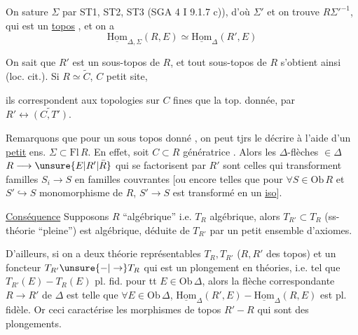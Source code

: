 On sature $\Sigma$ par ST1, ST2, ST3 (SGA 4 I 9.1.7 c)), d'où $\Sigma'$ et on trouve $R\Sigma'^{-1}$, qui est un \uline{topos} , et on a
\[
\underline{\mathrm{Hom}}_{\Delta,\Sigma}(R,E)\simeq\underline{\mathrm{Hom}}_\Delta(R',E)
\]




On sait que $R'$ est un sous-topos de $R$, et tout sous-topos de $R$ s'obtient ainsi (loc. cit.). Si $R\simeq\widetilde C$, $C$ petit site,


ils correspondent aux topologies  sur $C$  fines que la top. donnée, par $R'\longleftrightarrow\widetilde{(C,T')}$.

Remarquons que pour un sous topos donné , on peut tjrs le décrire à l'aide d'un \uline{petit} ens. $\Sigma\subset\mathrm{Fl}\,R$. En effet, soit $C\subset R$  génératrice . Alors les $\Delta$-flèches $\in\Delta$ $R\longrightarrow\unsure{E|R'|\bar R}$ qui se factorisent par $R'$ sont celles qui transforment familles  $S_i\to S$   en familles couvrantes [ou encore telles que pour $\forall S\in\mathrm{Ob}\,R$ et $S'\hookrightarrow S$ monomorphisme de  $R$, $S'\to S$ est transformé en un \uline{iso}].

\uline{Conséquence} Supposons $R$ ``algébrique'' i.e. $T_R$  algébrique, alors $T_{R'}\subset T_R$ (ss-théorie ``pleine'') est algébrique, déduite de $T_{R'}$ par un petit ensemble d'axiomes.

D'ailleurs, si on a deux théorie représentables $T_R,T_{R'}$ ($R,R'$ des topos) et un foncteur $T_{R'}\unsure{-|\to} T_R$ qui est un plongement en théories, i.e. tel que  $T_{R'}(E)-T_R(E)$ pl. fid. pour tt $E\in\mathrm{Ob}\,\Delta$,  alors la flèche correspondante $R\to R'$ de $\Delta$ est telle que $\forall E\in\mathrm{Ob}\,\Delta$, $\underline{\mathrm{Hom}}_\Delta(R',E)-\underline{\mathrm{Hom}}_\Delta(R,E)$ est pl. fidèle. Or ceci caractérise les morphismes de topos $R'-R$ qui sont des plongements.

